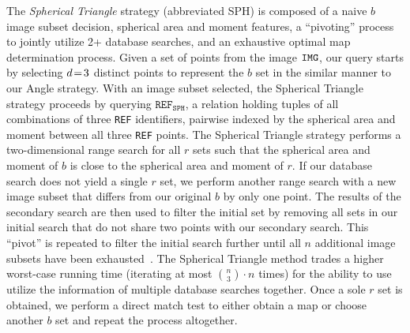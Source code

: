 
The \textit{Spherical Triangle} strategy (abbreviated SPH) is composed of a naive $b$ image subset decision, spherical area and moment features, a ``pivoting'' process to jointly utilize 2+ database searches, and an exhaustive optimal map determination process.
Given a set of points from the image $\texttt{IMG}$, our query starts by selecting $d\!=\! 3$ distinct points to represent the $b$ set in the similar manner to our Angle strategy.
With an image subset selected, the Spherical Triangle strategy proceeds by querying $\texttt{REF}_\texttt{SPH}$, a relation holding tuples of all combinations of three \texttt{REF} identifiers, pairwise indexed by the spherical area and moment between all three \texttt{REF} points.
The Spherical Triangle strategy performs a two-dimensional range search for all $r$ sets such that the spherical area and moment of $b$ is close to the spherical area and moment of $r$.
If our database search does not yield a single $r$ set, we perform another range search with a new image subset that differs from our original $b$ by only one point.
The results of the secondary search are then used to filter the initial set by removing all sets in our initial search that do not share two points with our secondary search.
This ``pivot'' is repeated to filter the initial search further until all $n$ additional image subsets have been exhausted~\cite{coleAndCrassidis:sphericalTriangleMethod}.
The Spherical Triangle method trades a higher worst-case running time (iterating at most $\binom{n}{3}\cdot n$ times) for the ability to use utilize the information of multiple database searches together.
Once a sole $r$ set is obtained, we perform a direct match test to either obtain a map or choose another $b$ set and repeat the process altogether.

